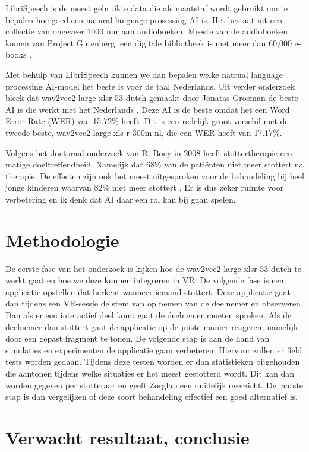 LibriSpeech is de meest gebruikte data die als maatstaf wordt gebruikt om te bepalen hoe goed een natural language prosessing AI is. Het bestaat uit een collectie van ongeveer 1000 uur aan audioboeken. Meeste van de audioboeken komen van Project Gutenberg, een digitale bibliotheek is met meer dan 60,000 e-books \autocite{Han2019}.\par

Met behulp van LibriSpeech kunnen we dan bepalen welke natrual language processing AI-model het beste is voor de taal Nederlands. Uit verder onderzoek bleek dat wav2vec2-large-xlsr-53-dutch gemaakt door Jonatas Grosman de beste AI is die werkt met het Nederlands \autocite{JonatasGrosman2022}. Deze AI is de beste omdat het een Word Error Rate (WER) van 15.72\% heeft .Dit is een redelijk groot verschil met de tweede beste, wav2vec2-large-xls-r-300m-nl, die een WER heeft van 17.17\%.\par

Volgens het doctoraal onderzoek van R. Boey in 2008 heeft stottertherapie een matige doeltreffendheid. Namelijk dat 68\% van de patiënten niet meer stottert na therapie. De effecten zijn ook het meest uitgesproken voor de behandeling bij heel jonge kinderen waarvan 82\% niet meer stottert \textcite{Boey2008}. Er is dus zeker ruimte voor verbetering en ik denk dat AI daar een rol kan bij gaan spelen. 

\section{Methodologie}%
\label{sec:methodologie}
De eerste fase van het onderzoek is kijken hoe de wav2vec2-large-xlsr-53-dutch te werkt gaat en hoe we deze kunnen integreren in VR. De volgende fase is een applicatie opstellen dat herkent wanneer iemand stottert. Deze applicatie gaat dan tijdens een VR-sessie de stem van op nemen van de deelnemer en observeren. Dan als er een interactief deel komt gaat de deelnemer moeten spreken. Als de deelnemer dan stottert gaat de applicatie op de juiste manier reageren, namelijk door een gepast fragment te tonen. De volgende stap is aan de hand van simulaties en experimenten de applicatie gaan verbeteren. Hiervoor zullen er field tests worden gedaan. Tijdens deze testen worden er dan statistieken bijgehouden die aantonen tijdens welke situaties er het meest gestotterd wordt. Dit kan dan worden gegeven per stotteraar en geeft Zorglab een duidelijk overzicht. De laatste stap is dan vergelijken of deze soort behandeling effectief een goed alternatief is.
\section{Verwacht resultaat, conclusie}%

\label{sec:verwachte_resultaten}

